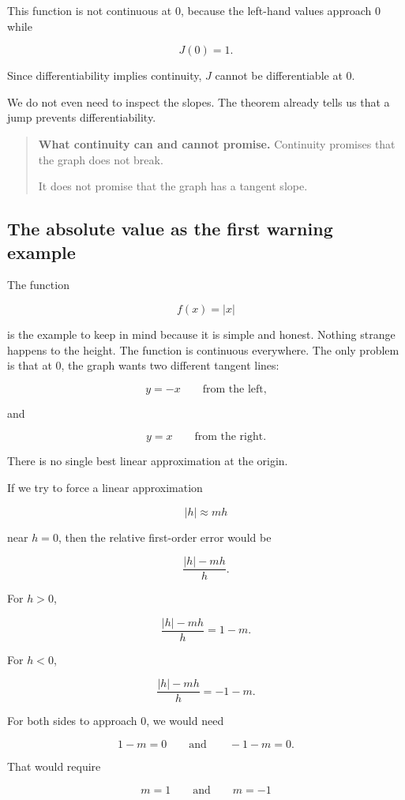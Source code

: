 This function is not continuous at \(0\), because the left-hand values approach \(0\) while

\[
J(0)=1.
\]

Since differentiability implies continuity, \(J\) cannot be differentiable at \(0\).

We do not even need to inspect the slopes.  The theorem already tells us that a jump prevents differentiability.

\begin{quote}
\textbf{What continuity can and cannot promise.}
Continuity promises that the graph does not break.

It does not promise that the graph has a tangent slope.
\end{quote}

\subsection{The absolute value as the first warning example}
\label{subsec:absolute-value-warning-example}

The function

\[
f(x)=|x|
\]

is the example to keep in mind because it is simple and honest.  Nothing strange happens to the height.  The function is continuous everywhere.  The only problem is that at \(0\), the graph wants two different tangent lines:

\[
y=-x
\qquad\text{from the left,}
\]

and

\[
y=x
\qquad\text{from the right.}
\]

There is no single best linear approximation at the origin.

If we try to force a linear approximation

\[
|h|\approx mh
\]

near \(h=0\), then the relative first-order error would be

\[
\frac{|h|-mh}{h}.
\]

For \(h>0\),

\[
\frac{|h|-mh}{h}
=
1-m.
\]

For \(h<0\),

\[
\frac{|h|-mh}{h}
=
-1-m.
\]

For both sides to approach \(0\), we would need

\[
1-m=0
\qquad\text{and}\qquad
-1-m=0.
\]

That would require

\[
m=1
\qquad\text{and}\qquad
m=-1
\]

